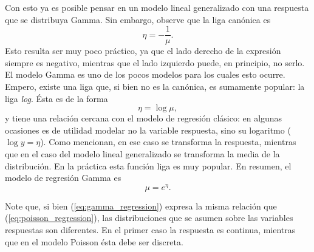 Con esto ya es posible pensar en un modelo lineal generalizado con una respuesta que se distribuya Gamma. Sin embargo, observe que la liga canónica es
\begin{equation*}
	\eta = -\frac{1}{\mu}.
\end{equation*}
Esto resulta ser muy poco práctico, ya que el lado derecho de la expresión siempre es negativo, mientras que el lado izquierdo puede, en principio, no serlo. El modelo Gamma es uno de los pocos modelos para los cuales esto ocurre. Empero, existe una liga que, si bien no es la canónica, es sumamente popular: la liga \textit{log}. Ésta es de la forma
\begin{equation}
	\eta = \log \mu,
\end{equation}
y tiene una relación cercana con el modelo de regresión clásico: en algunas ocasiones es de utilidad modelar no la variable respuesta, sino su logaritmo ($ \log y = \eta $). Como \cite{montgomery_glm} mencionan, en ese caso se transforma la respuesta, mientras que en el caso del modelo lineal generalizado se transforma la media de la distribución. En la práctica esta función liga es muy popular. En resumen, el modelo de regresión Gamma es
\begin{equation} \label{eq:gamma_regression}
	\mu = e^{\eta}.
\end{equation}

Note que, si bien (\ref{eq:gamma_regression}) expresa la misma relación que (\ref{eq:poisson_regression}), las distribuciones que se asumen sobre las variables respuestas son diferentes. En el primer caso la respuesta es continua, mientras que en el modelo Poisson ésta debe ser discreta.

